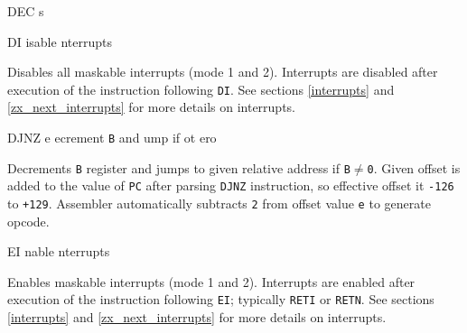 \documentclass[12pt,twoside,openright,a4paper]{book}
\begin{document}
\begin{basedescript}{
	\desclabelstyle{\multilinelabel}
	\desclabelwidth{3cm}}
\begin{DetailItem}{DEC s}
		\begin{DetailTiming}
		\end{DetailTiming}

	\end{DetailItem}

	\pagebreak
	\begin{DetailItem}{DI}
		{isable nterrupts}
		{\SymDI}

		Disables all maskable interrupts (mode 1 and 2). Interrupts are disabled after execution of the instruction following {\tt DI}. See sections \ref{interrupts} and \ref{zx_next_interrupts} for more details on interrupts.
		
		\DetailNoEffect
				
		\begin{DetailTiming}
			\DetailTime{}{1}{4}
		\end{DetailTiming}

	\end{DetailItem}

	\begin{DetailItem}{DJNZ e}
		{ecrement {\tt B} and ump if ot \IH{Z}ero}
		{\SymDJNZ{e}}

		Decrements {\tt B} register and jumps to given relative address if {\tt B$\neq$0}. Given offset is added to the value of {\tt PC} after parsing {\tt DJNZ} instruction, so effective offset it {\tt -126} to {\tt +129}. Assembler automatically subtracts {\tt 2} from offset value {\tt e} to generate opcode.

		\DetailNoEffect
				
		\begin{DetailTiming}
			\DetailTime{B=0}{2}{8}
			\DetailTime{B$\neq$0}{3}{13}
		\end{DetailTiming}

	\end{DetailItem}

	\begin{DetailItem}{EI}
		{nable nterrupts}
		{\SymEI}

		Enables maskable interrupts (mode 1 and 2). Interrupts are enabled after execution of the instruction following {\tt EI}; typically {\tt RETI} or {\tt RETN}. See sections \ref{interrupts} and \ref{zx_next_interrupts} for more details on interrupts.

		\DetailNoEffect
				

\end{DetailItem}
\end{basedescript}
\end{document}
